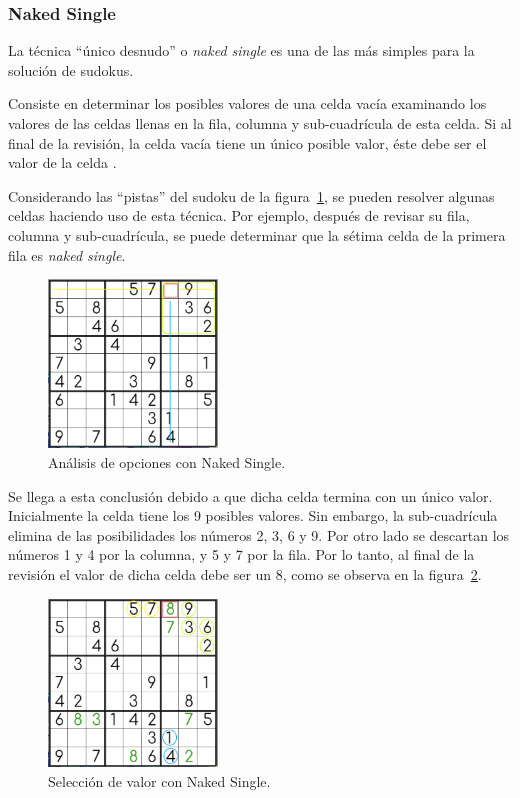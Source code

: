 \documentclass[conference]{IEEEtran}
\begin{document}
\subsubsection{Naked Single}
La técnica “único desnudo” o \textit{naked single} es una de las más simples para la solución de sudokus. 

Consiste en determinar los posibles valores de una celda vacía examinando los valores de las celdas llenas en la fila, columna y sub-cuadrícula de esta celda. Si al final de la revisión, la celda vacía tiene un único posible valor, éste debe ser el valor de la celda \cite{nakedSolving}.

Considerando las “pistas” del sudoku de la figura~\ref{fig:naked1}, se pueden resolver algunas celdas haciendo uso de esta técnica. Por ejemplo, después de revisar su fila, columna y sub-cuadrícula, se puede determinar que la sétima celda de la primera fila es \textit{naked single}.

\begin{otherlanguage}{spanish}
\begin{figure}[H]
\centering
\includegraphics[width=0.4\textwidth]{nakedsingle1.png}
\caption{\label{fig:naked1}Análisis de opciones con Naked Single.}
\end{figure}
\end{otherlanguage}

Se llega a esta conclusión debido a que dicha celda termina con un único valor. Inicialmente la celda tiene los 9 posibles valores. Sin embargo, la sub-cuadrícula elimina de las posibilidades los números 2, 3, 6 y 9. Por otro lado se descartan los números 1 y 4 por la columna, y 5 y 7 por la fila. Por lo tanto, al final de la revisión el valor de dicha celda debe ser un 8, como se observa en la figura~\ref{fig:naked2}.

\begin{otherlanguage}{spanish}
\begin{figure}[H]
\centering
\includegraphics[width=0.4\textwidth]{nakedsingle2.png}
\caption{\label{fig:naked2}Selección de valor con Naked Single.}
\end{figure}
\end{otherlanguage}
\end{document}
